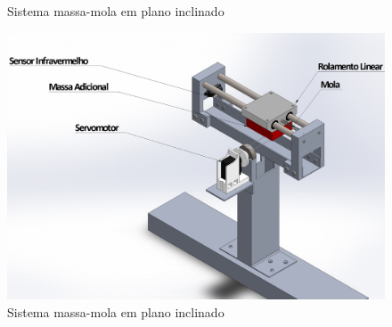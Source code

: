 \documentclass{relatorio}
\begin{document}
\begin{figure}[H]
		\caption{Sistema massa-mola em plano inclinado}%
		\label{fig:plant}
		\centering
		\captionsetup{justification=centering}
		\includegraphics[width=0.8\linewidth]{imgs/planta}
		\caption{Sistema massa-mola em plano inclinado}%
		\label{fig:plant}
	\end{figure}
\end{document}
